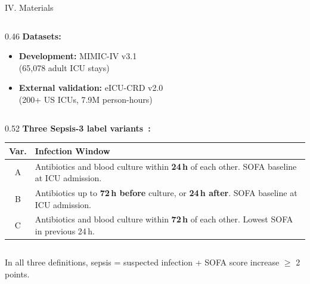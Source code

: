 \begin{frame}{IV. Materials}
\begin{atucols}[T]

\begin{column}{0.46\textwidth}
\textbf{Datasets:}
\begin{itemize}
  \item \textbf{Development:} MIMIC-IV v3.1~\cite{johnson2023mimiciv}\\
        (65,078 adult ICU stays)
  \item \textbf{External validation:} eICU-CRD
        v2.0~\cite{pollard2018eicu}\\
        (200+ US ICUs, 7.9M person-hours)
\end{itemize}
\end{column}

\begin{column}{0.52\textwidth}
\textbf{Three Sepsis-3 label variants~\cite{singer2016sepsis3}:}
\vspace{2pt}
\tablestyle
\begin{tabular}{cp{6.5cm}}
\toprule
\textbf{Var.} & \textbf{Infection Window} \\
\midrule
A & Antibiotics and blood culture within \textbf{24\,h} of each other.
    SOFA baseline at ICU admission. \\
B & Antibiotics up to \textbf{72\,h before} culture, or \textbf{24\,h
    after}. SOFA baseline at ICU admission. \\
C & Antibiotics and blood culture within \textbf{72\,h} of each other.
    Lowest SOFA in previous 24\,h. \\
\bottomrule
\end{tabular}
\end{column}

\end{atucols}

\vspace{6pt}
\begin{alertblock}{}
  \centering In all three definitions,
  sepsis = suspected infection + SOFA score increase $\geq$ 2 points.
\end{alertblock}
\end{frame}
